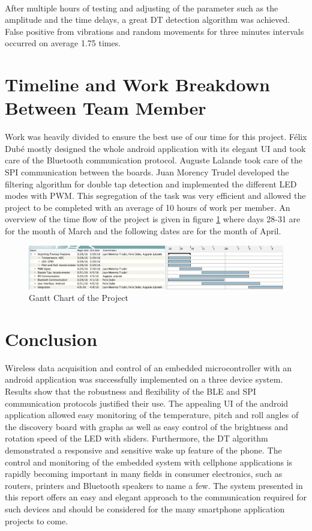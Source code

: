 \documentclass[12pt]{article}
\begin{document}
\paragraph{}
After multiple hours of testing and adjusting of the parameter such as the amplitude and the time delays, a great DT detection algorithm was achieved. False positive from vibrations and random movements for three minutes intervals occurred on average 1.75 times.

\section{Timeline and Work Breakdown Between Team Member}
Work was heavily divided to ensure the best use of our time for this project. Félix Dubé mostly designed the whole android application with its elegant UI and took care of the Bluetooth communication protocol. Auguste Lalande took care of the SPI communication between the boards. Juan Morency Trudel developed the filtering algorithm for double tap detection and implemented the different LED modes with PWM. This segregation of the task was very efficient and allowed the project to be completed with an average of 10 hours of work per member. An overview of the time flow of the project is given in figure \ref{fig:Gantt} where days 28-31 are for the month of March and the following dates are for the month of April.
\begin{figure}[!htb]
 \centering
 \includegraphics[scale=0.38]{images/gantt.png}
 \caption{Gantt Chart of the Project}
 \label{fig:Gantt}
\end{figure}
\section{Conclusion}
Wireless data acquisition and control of an embedded microcontroller with an android application was successfully implemented on a three device system. Results show that the robustness and flexibility of the BLE and SPI communication protocols justified their use. The appealing UI of the android application allowed easy monitoring of the temperature, pitch and roll angles of the discovery board with graphs as well as easy control of the brightness and rotation speed of the LED with sliders. Furthermore, the DT algorithm demonstrated a responsive and sensitive wake up feature of the phone. The control and monitoring of the embedded system with cellphone applications is rapidly becoming important in many fields in consumer electronics, such as routers, printers and Bluetooth speakers to name a few. The system presented in this report offers an easy and elegant approach to the communication required for such devices and should be considered for the many smartphone application projects to come.
\end{document}
